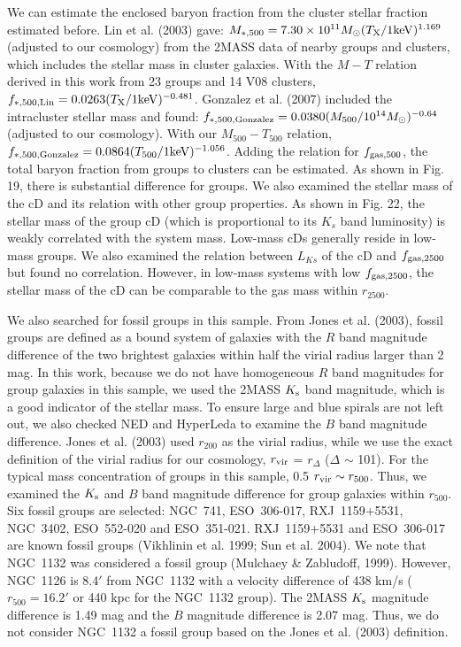 \documentclass{aastex}
\begin{document}
We can estimate the enclosed baryon fraction from the cluster stellar fraction
estimated before. Lin et al. (2003) gave: $M_{*, 500} = 7.30\times10^{11} M_{\odot}
(T_{\rm X} / 1 {\rm keV})^{1.169}$ (adjusted to our cosmology) from the 2MASS
data of nearby groups and clusters, which includes the stellar mass in cluster galaxies.
With the $M - T$ relation derived in this work from 23 groups and 14 V08 clusters,
$f_{\rm *, 500, Lin} = 0.0263 (T_{\rm X} / 1 {\rm keV})^{-0.481}$.
Gonzalez et al. (2007) included the intracluster stellar mass and found:
$f_{\rm *, 500, Gonzalez} = 0.0380 (M_{500} / 10^{14} M_{\odot})^{-0.64}$ (adjusted to our cosmology).
With our $M_{500} - T_{500}$ relation,
$f_{\rm *, 500, Gonzalez} = 0.0864 (T_{500} / 1 {\rm keV})^{-1.056}$.
Adding the relation for $f_{\rm gas, 500}$, the total baryon fraction from groups
to clusters can be estimated. As shown in Fig. 19, there is substantial difference
for groups. 
We also examined the stellar mass of the cD and its relation with
other group properties. As shown in Fig. 22, the stellar mass of the group cD (which is
proportional to its $K_{s}$ band luminosity) is weakly correlated with the system mass.
Low-mass cDs generally reside in low-mass groups. We also examined the relation between
$L_{Ks}$ of the cD and $f_{\rm gas, 2500}$ but found no correlation. However, in low-mass
systems with low $f_{\rm gas, 2500}$, the stellar mass of the cD can be comparable to
the gas mass within $r_{2500}$.

We also searched for fossil groups in this sample. From Jones et al. (2003), fossil
groups are defined as a bound system of galaxies with the $R$ band magnitude difference
of the two brightest galaxies within half the virial radius larger than 2 mag.
In this work, because we do not have homogeneous $R$ band magnitudes for group galaxies
in this sample, we used the 2MASS $K_{\rm s}$ band magnitude, which is
a good indicator of the stellar mass. To ensure large and blue spirals are not left
out, we also checked NED and HyperLeda to examine the $B$ band magnitude difference.
Jones et al. (2003) used $r_{200}$ as the virial radius, while we use the exact
definition of the virial radius for our cosmology, $r_{\rm vir}$ = $r_{\Delta}$ ($\Delta$
$\sim$ 101). For the typical mass concentration of groups in this sample,
0.5 $r_{\rm vir} \sim r_{500}$. Thus, we examined the $K_{\rm s}$ and $B$ band magnitude
difference for group galaxies within $r_{500}$.
Six fossil groups are selected: NGC~741, ESO~306-017, RXJ~1159+5531, NGC~3402, ESO~552-020
and ESO~351-021. RXJ~1159+5531 and ESO~306-017 are known fossil groups (Vikhlinin et al. 1999;
Sun et al. 2004). We note that NGC~1132 was considered a fossil group (Mulchaey \& Zabludoff,
1999). However, NGC~1126 is 8.4$'$ from NGC~1132 with a velocity difference of 438 km/s
($r_{500}=16.2'$ or 440 kpc for the NGC~1132 group). The 2MASS $K_{\rm s}$ magnitude
difference is 1.49 mag and the $B$ magnitude difference is 2.07 mag. Thus, we do not
consider NGC~1132 a fossil group based on the Jones et al. (2003) definition.
\end{document}
